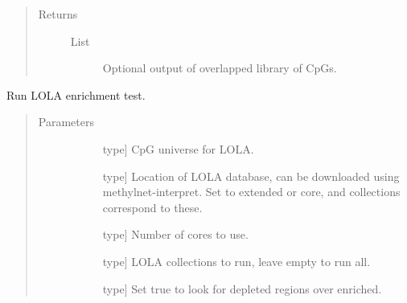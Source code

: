 \documentclass[letterpaper,10pt,english]{sphinxmanual}
\begin{document}
\begin{fulllineitems}
\begin{fulllineitems}
\begin{quote}
\begin{description}
\begin{description}
\end{description}

\item[{Returns}] \leavevmode\begin{description}
\item[{List}] \leavevmode
Optional output of overlapped library of CpGs.

\end{description}

\end{description}\end{quote}

\end{fulllineitems}


\begin{fulllineitems}
\label{\detokenize{index:methylnet.interpretation_classes.BioInterpreter.run_lola}}
Run LOLA enrichment test.
\begin{quote}\begin{description}
\item[{Parameters}] \leavevmode\begin{description}
\item[{}] \leavevmode{[}type{]}
CpG universe for LOLA.

\item[{}] \leavevmode{[}type{]}
Location of LOLA database, can be downloaded using methylnet-interpret. Set to extended or core, and collections correspond to these.

\item[{}] \leavevmode{[}type{]}
Number of cores to use.

\item[{}] \leavevmode{[}type{]}
LOLA collections to run, leave empty to run all.

\item[{}] \leavevmode{[}type{]}
Set true to look for depleted regions over enriched.

\end{description}


\end{description}
\end{quote}
\end{fulllineitems}
\end{fulllineitems}
\end{document}
